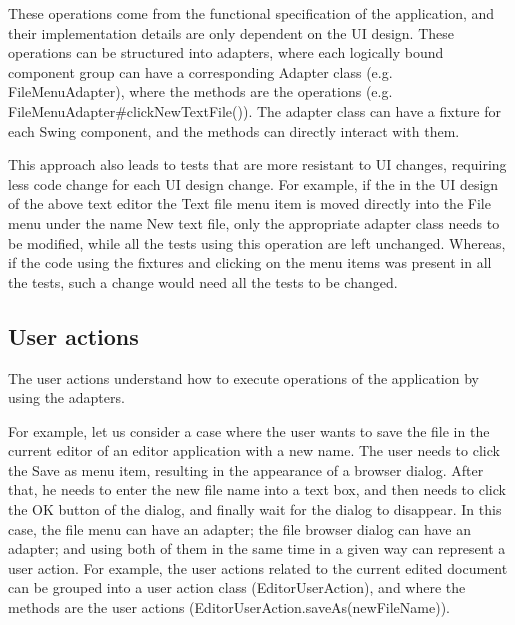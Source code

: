 These operations come from the functional specification of the application, and their implementation details are only dependent on the UI design. These operations can be structured into adapters, where each logically bound component group can have a corresponding Adapter class (e.g. FileMenuAdapter), where the methods are the operations (e.g. FileMenuAdapter\#clickNewTextFile()). The adapter class can have a fixture for each Swing component, and the methods can directly interact with them.

This approach also leads to tests that are more resistant to UI changes, requiring less code change for each UI design change. For example, if the in the UI design of the above text editor the Text file menu item is moved directly into the File menu under the name New text file, only the appropriate adapter class needs to be modified, while all the tests using this operation are left unchanged. Whereas, if the code using the fixtures and clicking on the menu items was present in all the tests, such a change would need all the tests to be changed.

\subsection {User actions}

The user actions understand how to execute operations of the application by using the adapters. 

For example, let us consider a case where the user wants to save the file in the current editor of an editor application with a new name. The user needs to click the Save as menu item, resulting in the appearance of a browser dialog. After that, he needs to enter the new file name into a text box, and then needs to click the OK button of the dialog, and finally wait for the dialog to disappear. In this case, the file menu can have an adapter; the file browser dialog can have an adapter; and using both of them in the same time in a given way can represent a user action. For example, the user actions related to the current edited document can be grouped into a user action class (EditorUserAction), and where the methods are the user actions (EditorUserAction.saveAs(newFileName)).














